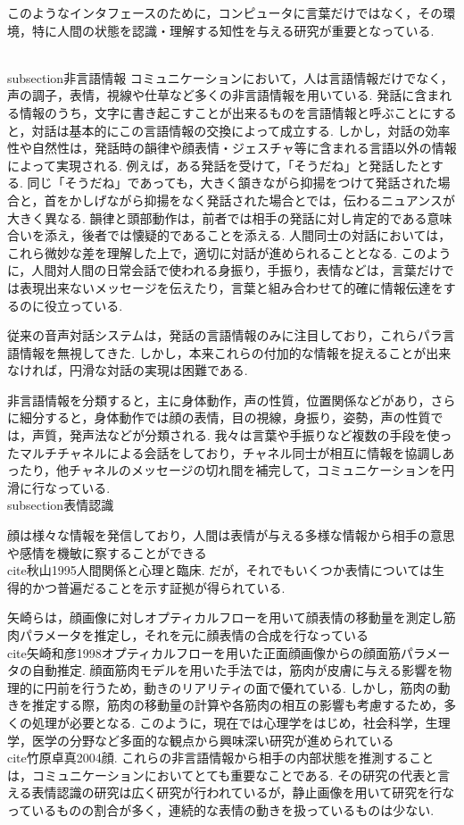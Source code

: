 このようなインタフェースのために，コンピュータに言葉だけではなく，その環境，特に人間の状態を認識・理解する知性を与える研究が重要となっている.

\\subsection{非言語情報}
コミュニケーションにおいて，人は言語情報だけでなく，声の調子，表情，視線や仕草など多くの非言語情報を用いている.
発話に含まれる情報のうち，文字に書き起こすことが出来るものを言語情報と呼ぶことにすると，対話は基本的にこの言語情報の交換によって成立する.
しかし，対話の効率性や自然性は，発話時の韻律や顔表情・ジェスチャ等に含まれる言語以外の情報によって実現される.
例えば，ある発話を受けて，「そうだね」と発話したとする.
同じ「そうだね」であっても，大きく頷きながら抑揚をつけて発話された場合と，首をかしげながら抑揚をなく発話された場合とでは，伝わるニュアンスが大きく異なる.
韻律と頭部動作は，前者では相手の発話に対し肯定的である意味合いを添え，後者では懐疑的であることを添える.
人間同士の対話においては，これら微妙な差を理解した上で，適切に対話が進められることとなる.
このように，人間対人間の日常会話で使われる身振り，手振り，表情などは，言葉だけでは表現出来ないメッセージを伝えたり，言葉と組み合わせて的確に情報伝達をするのに役立っている.

従来の音声対話システムは，発話の言語情報のみに注目しており，これらパラ言語情報を無視してきた.
しかし，本来これらの付加的な情報を捉えることが出来なければ，円滑な対話の実現は困難である.

非言語情報を分類すると，主に身体動作，声の性質，位置関係などがあり，さらに細分すると，身体動作では顔の表情，目の視線，身振り，姿勢，声の性質では，声質，発声法などが分類される.
我々は言葉や手振りなど複数の手段を使ったマルチチャネルによる会話をしており，チャネル同士が相互に情報を協調しあったり，他チャネルのメッセージの切れ間を補完して，コミュニケーションを円滑に行なっている.
\\subsection{表情認識}

顔は様々な情報を発信しており，人間は表情が与える多様な情報から相手の意思や感情を機敏に察することができる\\cite{秋山1995人間関係と心理と臨床}.
だが，それでもいくつか表情については生得的かつ普遍だることを示す証拠が得られている.

矢崎らは，顔画像に対しオプティカルフローを用いて顔表情の移動量を測定し筋肉パラメータを推定し，それを元に顔表情の合成を行なっている\\cite{矢崎和彦1998オプティカルフローを用いた正面顔画像からの顔面筋パラメータの自動推定}.
顔面筋肉モデルを用いた手法では，筋肉が皮膚に与える影響を物理的に円前を行うため，動きのリアリティの面で優れている.
しかし，筋肉の動きを推定する際，筋肉の移動量の計算や各筋肉の相互の影響も考慮するため，多くの処理が必要となる.
このように，現在では心理学をはじめ，社会科学，生理学，医学の分野など多面的な観点から興味深い研究が進められている\\cite{竹原卓真2004顔}.
これらの非言語情報から相手の内部状態を推測することは，コミュニケーションにおいてとても重要なことである.
その研究の代表と言える表情認識の研究は広く研究が行われているが，静止画像を用いて研究を行なっているものの割合が多く，連続的な表情の動きを扱っているものは少ない.

